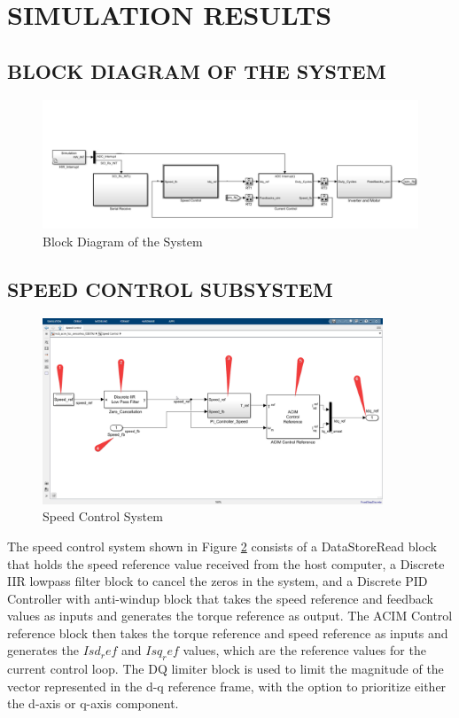 \section{SIMULATION RESULTS}

\subsection{BLOCK DIAGRAM OF THE SYSTEM}

\begin{figure}[H]
	\centering
	\includegraphics[width=6in]{sections/section3/images/simulation/blockDia.png}
	\caption{Block Diagram of the System}
	\label{fig:block_diagram}
\end{figure}


\subsection{SPEED CONTROL SUBSYSTEM}

\begin{figure}[H]
	\centering
	\includegraphics[width=4in]{sections/section3/images/simulation/speedControl/speedController.png}
	\caption{Speed Control System}
	\label{fig:speed_control_system}
\end{figure}


The speed control system shown in Figure \ref{fig:speed_control_system} consists of a DataStoreRead block that holds the speed reference value received from the host computer, a Discrete IIR lowpass filter block to cancel the zeros in the system, and a Discrete PID Controller with anti-windup block that takes the speed reference and feedback values as inputs and generates the torque reference as output. The ACIM Control reference block then takes the torque reference and speed reference as inputs and generates the $Isd_ref$ and $Isq_ref$ values, which are the reference values for the current control loop. The DQ limiter block is used to limit the magnitude of the vector represented in the d-q reference frame, with the option to prioritize either the d-axis or q-axis component.



